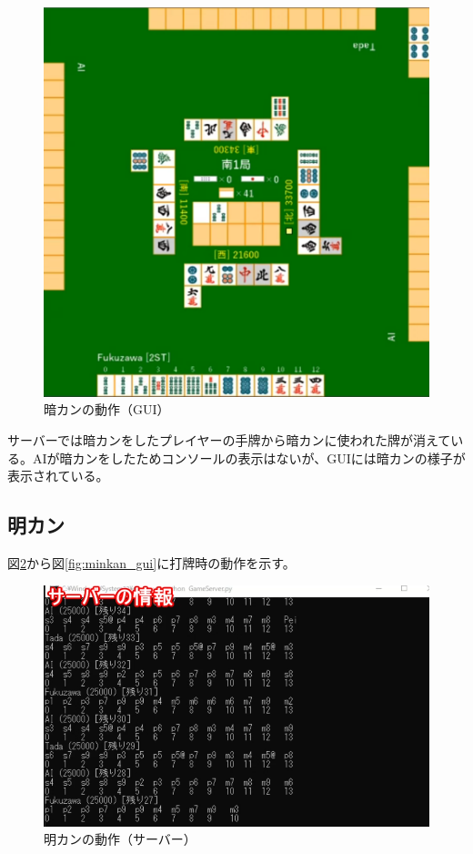 \documentclass[a4j,titlepage]{jsarticle}
\begin{document}
\begin{figure}[htbp]
  \centering
  \includegraphics[width = 0.8\linewidth]{images/ankan_gui.png}
  \caption{暗カンの動作（GUI）}
  \label{fig:ankan_gui}
\end{figure}

サーバーでは暗カンをしたプレイヤーの手牌から暗カンに使われた牌が消えている。AIが暗カンをしたためコンソールの表示はないが、GUIには暗カンの様子が表示されている。

\subsection{明カン}
図\ref{fig:minkan_server}から図\ref{fig:minkan_gui}に打牌時の動作を示す。

\begin{figure}[htbp]
  \centering
  \includegraphics[width = 0.8\linewidth]{images/minkan_server.png}
  \caption{明カンの動作（サーバー）}
  \label{fig:minkan_server}
\end{figure}
\end{document}
